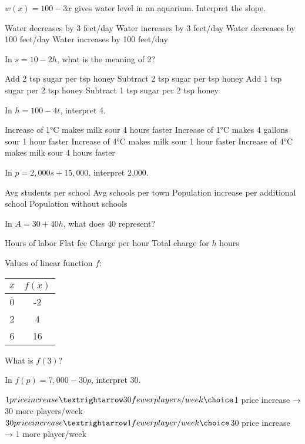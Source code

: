 \documentclass[12pt]{exam}
\begin{document}
\begin{questions}
\question $w(x) = 100 - 3x$ gives water level in an aquarium. Interpret the slope.
\begin{choices}
\choice Water decreases by 3 feet/day
\choice Water increases by 3 feet/day
\choice Water decreases by 100 feet/day
\choice Water increases by 100 feet/day
\end{choices}

\question In $s = 10 - 2h$, what is the meaning of 2?
\begin{choices}
\choice Add 2 tsp sugar per tsp honey
\choice Subtract 2 tsp sugar per tsp honey
\choice Add 1 tsp sugar per 2 tsp honey
\choice Subtract 1 tsp sugar per 2 tsp honey
\end{choices}

\question In $h = 100 - 4t$, interpret 4.
\begin{choices}
\choice Increase of 1°C makes milk sour 4 hours faster
\choice Increase of 1°C makes 4 gallons sour 1 hour faster
\choice Increase of 4°C makes milk sour 1 hour faster
\choice Increase of 4°C makes milk sour 4 hours faster
\end{choices}

\question In $p = 2,000s + 15,000$, interpret 2,000.
\begin{choices}
\choice Avg students per school
\choice Avg schools per town
\choice Population increase per additional school
\choice Population without schools
\end{choices}

\question In $A = 30 + 40h$, what does 40 represent?
\begin{choices}
\choice Hours of labor
\choice Flat fee
\choice Charge per hour
\choice Total charge for $h$ hours
\end{choices}

\question Values of linear function $f$:
\begin{center}
\begin{tabular}{|c|c|}
\hline
$x$ & $f(x)$ \\
\hline
0 & -2 \\
2 & 4 \\
6 & 16 \\
\hline
\end{tabular}
\end{center}
What is $f(3)$?
\begin{choices}
\end{choices}

\question In $f(p) = 7,000 - 30p$, interpret 30.
\begin{choices}
\choice $1 price increase → 30 fewer players/week
\choice $1 price increase → 30 more players/week
\choice $30 price increase → 1 fewer player/week
\choice $30 price increase → 1 more player/week
\end{choices}


\end{questions}
\end{document}
